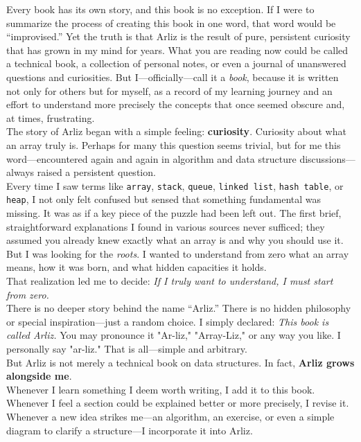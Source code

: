 \documentclass[12pt, oneside]{book}
\begin{document}
	Every book has its own story, and this book is no exception. If I were to summarize the process of creating this book in one word, that word would be “improvised.” Yet the truth is that Arliz is the result of pure, persistent curiosity that has grown in my mind for years. What you are reading now could be called a technical book, a collection of personal notes, or even a journal of unanswered questions and curiosities. But I—officially—call it a \emph{book}, because it is written not only for others but for myself, as a record of my learning journey and an effort to understand more precisely the concepts that once seemed obscure and, at times, frustrating.\\
	The story of Arliz began with a simple feeling: \textbf{curiosity}.  
	Curiosity about what an array truly is. Perhaps for many this question seems trivial, but for me this word—encountered again and again in algorithm and data structure discussions—always raised a persistent question.\\
	Every time I saw terms like \texttt{array}, \texttt{stack}, \texttt{queue}, \texttt{linked list}, \texttt{hash table}, or \texttt{heap}, I not only felt confused but sensed that something fundamental was missing. It was as if a key piece of the puzzle had been left out. The first brief, straightforward explanations I found in various sources never sufficed; they assumed you already knew exactly what an array is and why you should use it. But I was looking for the \emph{roots}. I wanted to understand from zero what an array means, how it was born, and what hidden capacities it holds.\\
	That realization led me to decide:  
	\emph{If I truly want to understand, I must start from zero.}\\	
	There is no deeper story behind the name “Arliz.” There is no hidden philosophy or special inspiration—just a random choice. I simply declared:  
	\emph{This book is called Arliz.}  
	You may pronounce it "Ar-liz," "Array-Liz," or any way you like. I personally say "ar-liz." That is all—simple and arbitrary.\\	
	But Arliz is not merely a technical book on data structures. In fact, \textbf{Arliz grows alongside me}. \\
	Whenever I learn something I deem worth writing, I add it to this book. Whenever I feel a section could be explained better or more precisely, I revise it. Whenever a new idea strikes me—an algorithm, an exercise, or even a simple diagram to clarify a structure—I incorporate it into Arliz.\\
\end{document}
